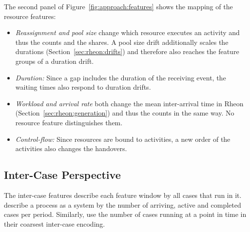 The second panel of Figure~\ref{fig:approach:features} shows the mapping of the resource features:
\begin{itemize}
	\item \emph{Reassignment and pool size} change which resource executes an activity and thus the counts and the shares. A pool size drift additionally scales the durations (Section~\ref{sec:rheon:drifts}) and therefore also reaches the feature groups of a duration drift.
	\item \emph{Duration:} Since a gap includes the duration of the receiving event, the waiting times also respond to duration drifts.
	\item \emph{Workload and arrival rate} both change the mean inter-arrival time in Rheon (Section~\ref{sec:rheon:generation}) and thus the counts in the same way. No resource feature distinguishes them.
	\item \emph{Control-flow:} Since resources are bound to activities, a new order of the activities also changes the handovers.
\end{itemize}

\subsection{Inter-Case Perspective}
\label{sec:approach:features:inter}
The inter-case features describe each feature window by all cases that run in it. \textcite{kraus2026steady} describe a process as a system by the number of arriving, active and completed cases per period. Similarly, \textcite{senderovich2017intra} use the number of cases running at a point in time in their coarsest inter-case encoding.

